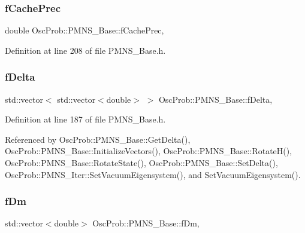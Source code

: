 \subsubsection{\texorpdfstring{f\+Cache\+Prec}{fCachePrec}}
{\footnotesize\ttfamily double Osc\+Prob\+::\+P\+M\+N\+S\+\_\+\+Base\+::f\+Cache\+Prec\hspace{0.3cm}{\ttfamily [protected]}, {\ttfamily [inherited]}}



Definition at line 208 of file P\+M\+N\+S\+\_\+\+Base.\+h.

\mbox{\label{classOscProb_1_1PMNS__Base_ab2a5fa40e689b221c8a7d2c17213810d}} 
\subsubsection{\texorpdfstring{f\+Delta}{fDelta}}
{\footnotesize\ttfamily std\+::vector$<$ std\+::vector$<$double$>$ $>$ Osc\+Prob\+::\+P\+M\+N\+S\+\_\+\+Base\+::f\+Delta\hspace{0.3cm}{\ttfamily [protected]}, {\ttfamily [inherited]}}



Definition at line 187 of file P\+M\+N\+S\+\_\+\+Base.\+h.



Referenced by Osc\+Prob\+::\+P\+M\+N\+S\+\_\+\+Base\+::\+Get\+Delta(), Osc\+Prob\+::\+P\+M\+N\+S\+\_\+\+Base\+::\+Initialize\+Vectors(), Osc\+Prob\+::\+P\+M\+N\+S\+\_\+\+Base\+::\+Rotate\+H(), Osc\+Prob\+::\+P\+M\+N\+S\+\_\+\+Base\+::\+Rotate\+State(), Osc\+Prob\+::\+P\+M\+N\+S\+\_\+\+Base\+::\+Set\+Delta(), Osc\+Prob\+::\+P\+M\+N\+S\+\_\+\+Iter\+::\+Set\+Vacuum\+Eigensystem(), and Set\+Vacuum\+Eigensystem().

\mbox{\label{classOscProb_1_1PMNS__Base_a406a31c3b5d620e5a0cace5b411f9f70}} 
\subsubsection{\texorpdfstring{f\+Dm}{fDm}}
{\footnotesize\ttfamily std\+::vector$<$double$>$ Osc\+Prob\+::\+P\+M\+N\+S\+\_\+\+Base\+::f\+Dm\hspace{0.3cm}{\ttfamily [protected]}, {\ttfamily [inherited]}}



